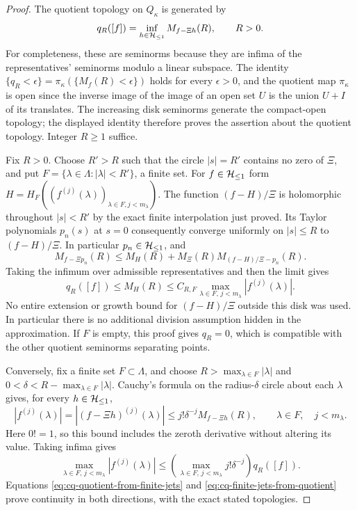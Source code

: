 \begin{proof}
The quotient topology on $Q_\kappa$ is generated by
\begin{equation}\label{eq:cq-compact-quotient-seminorm}
 q_R([f])=\inf_{h\in\mathcal H_{\leq 1}}M_{f-\Xi h}(R),\qquad R>0.
\end{equation}
For completeness, these are seminorms because they are infima of
the representatives' seminorms modulo a linear subspace. The
identity
$\{q_R<\epsilon\}=\pi_\kappa(\{M_f(R)<\epsilon\})$
holds for every $\epsilon>0$, and the quotient map
$\pi_\kappa$ is open since the inverse image of the image of
an open set $U$ is the union $U+I$ of its translates.
The increasing disk seminorms generate the compact-open topology;
the displayed identity therefore proves the assertion about the
quotient topology. Integer $R\geq1$ suffice.

Fix $R>0$. Choose $R'>R$ such that the circle $|s|=R'$
contains no zero of $\Xi$, and put
$F=\{\lambda\in\Lambda:|\lambda|<R'\}$, a finite set.
For $f\in\mathcal H_{\leq 1}$ form
$H=H_F((f^{(j)}(\lambda))_{\lambda\in F,j<m_\lambda})$.
The function $(f-H)/\Xi$ is holomorphic throughout $|s|<R'$
by the exact finite interpolation just proved. Its Taylor
polynomials $p_n(s)$ at $s=0$ consequently converge uniformly on
$|s|\leq R$ to $(f-H)/\Xi$. In particular $p_n\in\mathcal H_{\leq 1}$,
and
\[
 M_{f-\Xi p_n}(R)
 \leq M_H(R)+M_\Xi(R)
        M_{(f-H)/\Xi-p_n}(R).
\]
Taking the infimum over admissible representatives and then the
limit gives
\begin{equation}\label{eq:cq-quotient-from-finite-jets}
 q_R([f])\leq M_H(R)
 \leq C_{R,F}
       \max_{\lambda\in F,\,j<m_\lambda}|f^{(j)}(\lambda)|.
\end{equation}
No entire extension or growth bound for $(f-H)/\Xi$ outside this
disk was used. In particular there is no additional division
assumption hidden in the approximation. If $F$ is empty, this
proof gives $q_R=0$, which is compatible with the other quotient
seminorms separating points.

Conversely, fix a finite set $F\subset\Lambda$, and choose
$R>\max_{\lambda\in F}|\lambda|$ and
$0<\delta<R-\max_{\lambda\in F}|\lambda|$.
Cauchy's formula on the radius-$\delta$ circle about each
$\lambda$ gives, for every $h\in\mathcal H_{\leq 1}$,
\[
 |f^{(j)}(\lambda)|
 =|(f-\Xi h)^{(j)}(\lambda)|
 \leq j!\delta^{-j}M_{f-\Xi h}(R),
 \qquad\lambda\in F,\quad j<m_\lambda.
\]
Here $0!=1$, so this bound includes the zeroth derivative without
altering its value. Taking infima gives
\begin{equation}\label{eq:cq-finite-jets-from-quotient}
 \max_{\lambda\in F,\,j<m_\lambda}|f^{(j)}(\lambda)|
 \leq\left(\max_{\lambda\in F,\,j<m_\lambda}
                        j!\delta^{-j}\right)q_R([f]).
\end{equation}
Equations \eqref{eq:cq-quotient-from-finite-jets} and
\eqref{eq:cq-finite-jets-from-quotient} prove continuity in both
directions, with the exact stated topologies.


\end{proof}
